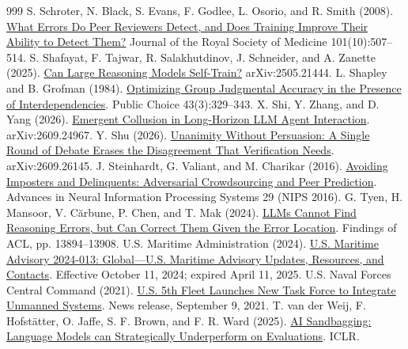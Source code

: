 \documentclass[12pt,letterpaper]{article}
\begin{document}
\begin{thebibliography}{999}
 S. Schroter, N. Black, S. Evans, F. Godlee, L. Osorio, and R. Smith (2008). \href{https://doi.org/10.1258/jrsm.2008.080062}{What Errors Do Peer Reviewers Detect, and Does Training Improve Their Ability to Detect Them?} Journal of the Royal Society of Medicine 101(10):507--514.
 S. Shafayat, F. Tajwar, R. Salakhutdinov, J. Schneider, and A. Zanette (2025). \href{https://arxiv.org/abs/2505.21444}{Can Large Reasoning Models Self-Train?} arXiv:2505.21444.
 L. Shapley and B. Grofman (1984). \href{https://doi.org/10.1007/BF00118940}{Optimizing Group Judgmental Accuracy in the Presence of Interdependencies}. Public Choice 43(3):329--343.
 X. Shi, Y. Zhang, and D. Yang (2026). \href{https://arxiv.org/abs/2609.24967}{Emergent Collusion in Long-Horizon LLM Agent Interaction}. arXiv:2609.24967.
 Y. Shu (2026). \href{https://arxiv.org/abs/2609.26145}{Unanimity Without Persuasion: A Single Round of Debate Erases the Disagreement That Verification Needs}. arXiv:2609.26145.
 J. Steinhardt, G. Valiant, and M. Charikar (2016). \href{https://papers.nips.cc/paper_files/paper/2016/hash/0a87257e5308197df43230edf4ad1dae-Abstract.html}{Avoiding Imposters and Delinquents: Adversarial Crowdsourcing and Peer Prediction}. Advances in Neural Information Processing Systems 29 (NIPS 2016).
 G. Tyen, H. Mansoor, V. C\u{a}rbune, P. Chen, and T. Mak (2024). \href{https://doi.org/10.18653/v1/2024.findings-acl.826}{LLMs Cannot Find Reasoning Errors, but Can Correct Them Given the Error Location}. Findings of ACL, pp. 13894--13908.
 U.S. Maritime Administration (2024). \href{https://www.maritime.dot.gov/msci/2024-013-global-us-maritime-advisory-updates-resources-and-contacts}{U.S. Maritime Advisory 2024-013: Global---U.S. Maritime Advisory Updates, Resources, and Contacts}. Effective October 11, 2024; expired April 11, 2025.
 U.S. Naval Forces Central Command (2021). \href{https://www.cusnc.navy.mil/Media/News/Display/Article/2768468/us-5th-fleet-launches-new-task-force-to-integrate-unmanned-systems/}{U.S. 5th Fleet Launches New Task Force to Integrate Unmanned Systems}. News release, September 9, 2021.
 T. van der Weij, F. Hofst\"atter, O. Jaffe, S. F. Brown, and F. R. Ward (2025). \href{https://openreview.net/forum?id=7Qa2SpjxIS}{AI Sandbagging: Language Models can Strategically Underperform on Evaluations}. ICLR.

\end{thebibliography}
\end{document}
